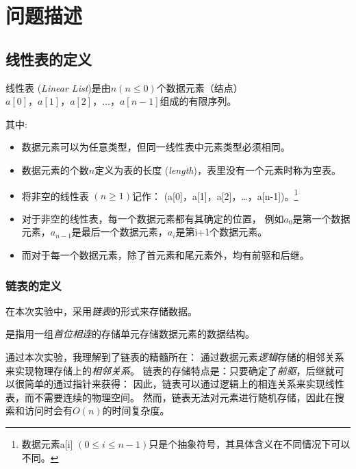\section{问题描述}
\subsection{线性表的定义}
\begin{definition}\label{def:linear list2}
    线性表 (\emph{Linear List})是由$n (n \le 0)$个数据元素（结点）$a[0]，a[1]，a[2]，\dots ，a[n-1]$组成的有限序列。
\end{definition}
其中:
\begin{itemize}
    \item 数据元素可以为任意类型，但同一线性表中元素类型必须相同。
    \item 数据元素的个数$n$定义为表的长度 (\emph{length})，表里没有一个元素时称为空表。
    \item 将非空的线性表 $(n \ge 1)$记作： (a[0]，a[1]，a[2]，\dots ，a[n-1])。\footnote{数据元素a[i] $(0\le i \le n-1)$只是个抽象符号，其具体含义在不同情况下可以不同。}
    \item 对于非空的线性表，每一个数据元素都有其确定的位置，
        例如$a_{0}$是第一个数据元素，$a_{n-1}$是最后一个数据元素，$a_i$是第i+1个数据元素。
    \item 而对于每一个数据元素，除了首元素和尾元素外，均有前驱和后继。
\end{itemize}
\subsubsection{链表的定义}
在本次实验中，采用\emph{链表}的形式来存储数据。
\begin{definition}\label{def:linked-list}
    是指用一组\emph{首位相连}的存储单元存储数据元素的数据结构。
\end{definition}
通过本次实验，我理解到了链表的精髓所在：
通过数据元素\emph{逻辑}存储的相邻关系来实现物理存储上的\emph{相邻关系}。
\newline
链表的存储特点是：只要确定了\emph{前驱}，后继就可以很简单的通过指针来获得：
因此，链表可以通过逻辑上的相连关系来实现线性表，而不需要连续的物理空间。
然而，链表无法对元素进行随机存储，因此在搜索和访问时会有$O(n)$的时间复杂度。
